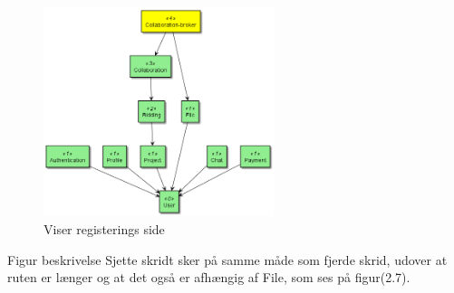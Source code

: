 \begin{figure}[ht]
    \centering
\includegraphics[width=0.6\textwidth]{integrationstest-image/step_6_dependencieTree.png}
\caption{Viser registerings side}
\label{fig:figure2}
\end{figure}


Figur beskrivelse
Sjette skridt sker på samme måde som fjerde skrid, udover at ruten er længer og at det også er afhængig af File, som ses på figur(2.7). 


